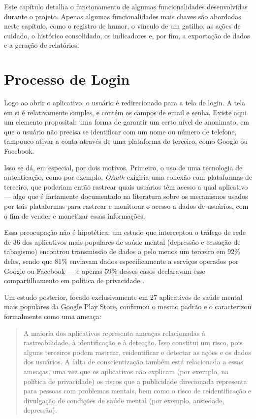 Este capítulo detalha o funcionamento de algumas funcionalidades
desenvolvidas durante o projeto. Apenas algumas funcionalidades mais
chaves são abordadas neste capítulo, como o registro de humor, o vínculo
de um gatilho, as ações de cuidado, o histórico consolidado, os
indicadores e, por fim, a exportação de dados e a geração de relatórios.

\section{Processo de Login}

Logo ao abrir o aplicativo, o usuário é redirecionado para a tela de
login. A tela em si é relativamente simples, e contém os campos de
email e senha. Existe aqui um elemento proposital: uma forma de
garantir um certo nível de anonimato, em que o usuário não precisa se
identificar com um nome ou número de telefone, tampouco ativar a conta
através de uma plataforma de terceiro, como Google ou Facebook.

Isso se dá, em especial, por dois motivos. Primeiro, o uso de uma tecnologia de
autenticação, como por exemplo, \textit{OAuth} \cite{Hardt:2012} exigiria uma
conexão com plataformas de terceiro, que poderiam então rastrear quais usuários
têm acesso a qual aplicativo --- algo que é fartamente documentado na literatura
sobre os mecanismos usados por tais plataformas para rastrear e monitorar o
acesso a dados de usuários, com o fim de vender e monetizar essas informações.

Essa preocupação não é hipotética: um estudo que interceptou o tráfego de rede
de 36 dos aplicativos mais populares de saúde mental (depressão e cessação de
tabagismo) encontrou transmissão de dados a pelo menos um terceiro em 92\%
deles, sendo que 81\% enviavam dados especificamente a serviços operados por
Google ou Facebook --- e apenas 59\% desses casos declaravam esse
compartilhamento em política de privacidade \cite{Huckvale2019}.

Um estudo posterior, focado exclusivamente em 27 aplicativos de saúde
mental mais populares da Google Play Store, confirmou o mesmo padrão e
o caracterizou formalmente como uma ameaça:

\begin{quote}
  A maioria dos aplicativos representa ameaças relacionadas à rastreabilidade,
  à identificação e à detecção. Isso constitui um risco, pois  alguns terceiros
  podem rastrear, reidentificar e detectar as ações e os dados dos usuários. A
  falta de conscientização também está relacionada a essas ameaças, uma vez que
  os aplicativos não explicam (por exemplo, na política de privacidade) os
  riscos que a publicidade direcionada representa para pessoas com problemas
  mentais, bem como o risco de reidentificação e divulgação de condições de
  saúde mental (por exemplo, ansiedade, depressão).
  \cite[p.~3, tradução nossa]{Iwaya:22}
\end{quote}

